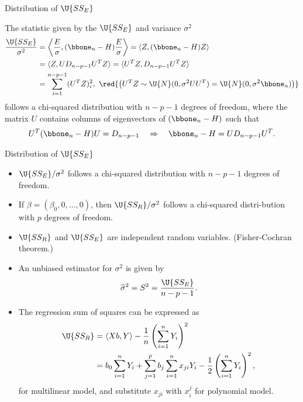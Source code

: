 \begin{frame}{Distribution of $\U{SS_E}$}

\justifying
{} The statistic given by the $\U{SS_E}$ and variance $\sigma^2$
\begin{align*}
\frac{\U{SS_E}}{\sigma^2} & = \left\langle \frac{E}{\sigma}, (\bbone_n - H)\frac{E}{\sigma}\right\rangle = \langle Z, (\bbone_n - H)Z\rangle \\
& = \langle Z, UD_{n-p-1}U^TZ\rangle = \langle U^TZ, D_{n-p-1}U^TZ\rangle \\
& = \sum_{i=1}^{n-p-1} (U^TZ)_i^2,\  \red{\left(U^TZ \sim \U{N}(0, \sigma^2 UU^T) = \U{N}(0, \sigma^2\bbone_n) \right)}
\end{align*}
follows a chi-squared distribution with $n-p-1$ degrees of freedom, where the matrix $U$ contains columns of eigenvectors of $(\bbone_n-H)$ such that
\begin{align*}
U^T(\bbone_n-H)U = D_{n-p-1}\quad\Rightarrow\quad \bbone_n - H = UD_{n-p-1}U^T.
\end{align*}

\end{frame}

\begin{frame}{Distribution of $\U{SS_E}$}

\begin{itemize}
	\justifying
	\item $\U{SS_E}/\sigma^2$ follows a chi-squared distribution with $n-p-1$ degrees of freedom.
	\item If $\beta = (\beta_0, 0, \ldots, 0)$, then $\U{SS_R}/\sigma^2$ follows a chi-squared distri-bution with $p$ degrees of freedom.
	\item $\U{SS_R}$ and $\U{SS_E}$ are independent random variables. (Fisher-Cochran theorem.)
	\item An unbiased estimator for $\sigma^2$ is given by
	\footnotesize
	\begin{align*}
	\widehat{\sigma}^2 = S^2 = \frac{\U{SS_E}}{n-p-1}.
	\end{align*}
	\normalsize
	\item The regression sum of squares can be expressed as
	\footnotesize
	\begin{align*}
	\U{SS_R} & = \langle Xb, Y\rangle - \frac{1}{n}\left(\sum_{i=1}^n Y_i \right)^2 \\
	& = b_0\sum_{i=1}^n Y_i + \sum_{j=1}^p b_j \sum_{i=1}^{n} x_{ji}Y_i - \frac{1}{2}\left(\sum_{i=1}^n Y_i \right)^2,
	\end{align*}
	\normalsize
	for multilinear model, and substitute $x_{ji}$ with $x_{i}^j$ for polynomial model.
\end{itemize}

\end{frame}

